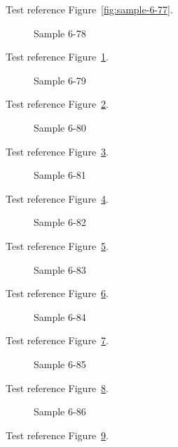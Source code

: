 Test reference Figure~\ref{fig:sample-6-77}.

\begin{figure}[tbhp]
\caption{Sample 6-78}
\label{fig:sample-6-78}
\end{figure}

Test reference Figure~\ref{fig:sample-6-78}.

\begin{figure}[tbhp]
\caption{Sample 6-79}
\label{fig:sample-6-79}
\end{figure}

Test reference Figure~\ref{fig:sample-6-79}.

\begin{figure}[tbhp]
\caption{Sample 6-80}
\label{fig:sample-6-80}
\end{figure}

Test reference Figure~\ref{fig:sample-6-80}.

\begin{figure}[tbhp]
\caption{Sample 6-81}
\label{fig:sample-6-81}
\end{figure}

Test reference Figure~\ref{fig:sample-6-81}.

\begin{figure}[tbhp]
\caption{Sample 6-82}
\label{fig:sample-6-82}
\end{figure}

Test reference Figure~\ref{fig:sample-6-82}.

\begin{figure}[tbhp]
\caption{Sample 6-83}
\label{fig:sample-6-83}
\end{figure}

Test reference Figure~\ref{fig:sample-6-83}.

\begin{figure}[tbhp]
\caption{Sample 6-84}
\label{fig:sample-6-84}
\end{figure}

Test reference Figure~\ref{fig:sample-6-84}.

\begin{figure}[tbhp]
\caption{Sample 6-85}
\label{fig:sample-6-85}
\end{figure}

Test reference Figure~\ref{fig:sample-6-85}.

\begin{figure}[tbhp]
\caption{Sample 6-86}
\label{fig:sample-6-86}
\end{figure}

Test reference Figure~\ref{fig:sample-6-86}.


